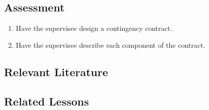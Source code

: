 \subsection{Assessment}
\begin{enumerate}
\item Have the supervisee design a contingency contract.
\item Have the supervisee describe each component of the contract.
\end{enumerate}
%
\subsection{Relevant Literature}
\begin{refsection}
\nocite{cooper2007applied,miller1994use}
\printbibliography[heading=none]
\end{refsection}
%
\subsection{Related Lessons}
\fourkTwo{}\\
\fourFKFourtyTwo{}\\
